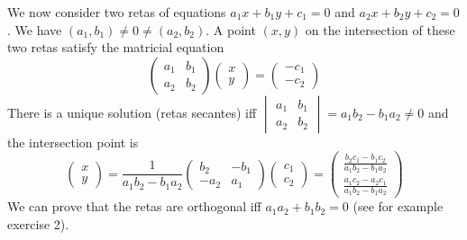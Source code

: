 We now consider two retas of equations $a_1x + b_1y+c_1=0$ and
$a_2x + b_2y+c_2=0$. We have $(a_1,b_1) \neq 0 \neq (a_2,b_2)$.
A point $(x,y)$ on the intersection of these two retas
satisfy the matricial equation
$$
\begin{pmatrix}
  a_1 & b_1 \\
  a_2 & b_2
\end{pmatrix}
\begin{pmatrix}
  x \\
  y
\end{pmatrix}
=
\begin{pmatrix}
  -c_1 \\
  -c_2
\end{pmatrix}
$$
There is a unique solution (retas secantes) iff
$\begin{vmatrix}
a_1 & b_1 \\
a_2 & b_2
\end{vmatrix} = a_1b_2 - b_1a_2 \neq 0$ and the intersection point is
$$\begin{pmatrix}
  x \\
  y
\end{pmatrix} =
\frac{1}{a_1b_2 - b_1a_2}
\begin{pmatrix}
  b_2 & -b_1 \\
  -a_2 & a_1
\end{pmatrix}\begin{pmatrix}
  c_1 \\
  c_2
\end{pmatrix} = \begin{pmatrix}
  \frac{b_2c_1-b_1c_2}{a_1b_2 - b_1a_2} \\
  \frac{a_1c_2-a_2c_1}{a_1b_2 - b_1a_2}
\end{pmatrix}$$
We can prove that the retas are orthogonal iff
$a_1a_2+b_1b_2=0$ (see for example exercise 2).

